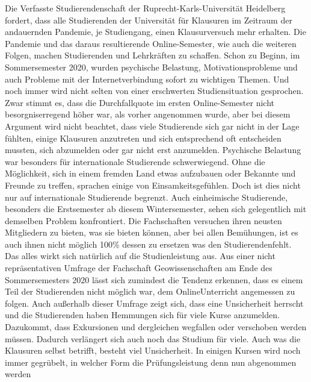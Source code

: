    {
        Die Verfasste Studierendenschaft der Ruprecht-Karls-Universität Heidelberg fordert,
        dass alle Studierenden der Universität für Klausuren im Zeitraum der andauernden
        Pandemie, je Studiengang, einen Klausurversuch mehr erhalten.
    }{
        Die Pandemie und das daraus resultierende Online-Semester, wie auch die weiteren
        Folgen, machen Studierenden und Lehrkräften zu schaffen. Schon zu Beginn, im
        Sommersemester 2020, wurden psychische Belastung, Motivationsprobleme und auch
        Probleme mit der Internetverbindung sofort zu wichtigen Themen. Und noch immer wird
        nicht selten von einer erschwerten Studiensituation gesprochen. Zwar stimmt es, dass die
        Durchfallquote im ersten Online-Semester nicht besorgniserregend höher war, als vorher
        angenommen wurde, aber bei diesem Argument wird nicht beachtet, dass viele
        Studierende sich gar nicht in der Lage fühlten, einige Klausuren anzutreten und sich
        entsprechend oft entscheiden mussten, sich abzumelden oder gar nicht erst anzumelden.
        Psychische Belastung war besonders für internationale Studierende schwerwiegend.
        Ohne die Möglichkeit, sich in einem fremden Land etwas aufzubauen oder Bekannte und
        Freunde zu treffen, sprachen einige von Einsamkeitsgefühlen. Doch ist dies nicht nur auf
        internationale Studierende begrenzt. Auch einheimische Studierende, besonders die
        Erstsemester ab diesem Wintersemester, sehen sich gelegentlich mit demselben Problem
        konfrontiert. Die Fachschaften versuchen ihren neusten Mitgliedern zu bieten, was sie
        bieten können, aber bei allen Bemühungen, ist es auch ihnen nicht möglich 100\% dessen
        zu ersetzen was den Studierendenfehlt. Das alles wirkt sich natürlich auf die
        Studienleistung aus. Aus einer nicht repräsentativen Umfrage der Fachschaft
        Geowissenschaften am Ende des Sommersemesters 2020 lässt sich zumindest die
        Tendenz erkennen, dass es einem Teil der Studierenden nicht möglich war, dem
        OnlineUnterricht angemessen zu folgen. Auch außerhalb dieser Umfrage zeigt sich, dass eine
        Unsicherheit herrscht und die Studierenden haben Hemmungen sich für viele Kurse
        anzumelden. Dazukommt, dass Exkursionen und dergleichen wegfallen oder verschoben
        werden müssen. Dadurch verlängert sich auch noch das Studium für viele. Auch
        was die Klausuren selbst betrifft, besteht viel Unsicherheit. In einigen Kursen wird noch
        immer gegrübelt, in welcher Form die Prüfungsleistung denn nun abgenommen werden
}
